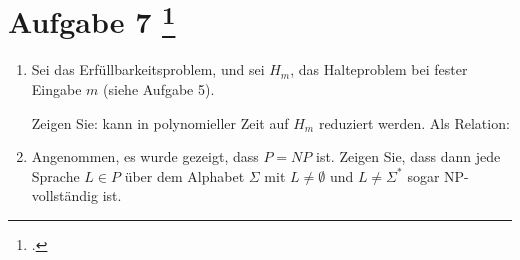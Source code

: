 \documentclass{bschlangaul-aufgabe}
\begin{document}
\liAufgabenTitel{}
\section{Aufgabe 7
\footcite{examen:66115:2014:03}}

\begin{enumerate}


\item Sei  das Erfüllbarkeitsproblem, und sei $H_m$,
das Halteproblem bei fester Eingabe $m$ (siehe Aufgabe 5).

Zeigen Sie:  kann in polynomieller Zeit auf $H_m$
reduziert werden. Als Relation:



\item Angenommen, es wurde gezeigt, dass $P = NP$ ist. Zeigen Sie, dass
dann jede Sprache $L \in P$ über dem Alphabet $\Sigma$ mit $L \neq
\emptyset$ und $L \neq \Sigma^*$ sogar NP-vollständig ist.

\end{enumerate}
\end{document}
